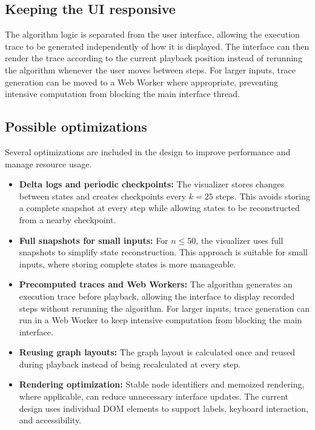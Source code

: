 \documentclass[11pt,a4paper]{article}
\begin{document}
\subsection{Keeping the UI responsive}
The algorithm logic is separated from the user interface, allowing the execution trace to be generated independently of how it is displayed. The interface can then render the trace according to the current playback position instead of rerunning the algorithm whenever the user moves between steps. For larger inputs, trace generation can be moved to a Web Worker where appropriate, preventing intensive computation from blocking the main interface thread.


\subsection{Possible optimizations}

Several optimizations are included in the design to improve
performance and manage resource usage.

\begin{itemize}
    \item \textbf{Delta logs and periodic checkpoints:}
    The visualizer stores changes between states and creates
    checkpoints every $k=25$ steps. This avoids storing a
    complete snapshot at every step while allowing states to
    be reconstructed from a nearby checkpoint.

    \item \textbf{Full snapshots for small inputs:}
    For $n \leq 50$, the visualizer uses full snapshots to
    simplify state reconstruction. This approach is suitable
    for small inputs, where storing complete states is more
    manageable.

    \item \textbf{Precomputed traces and Web Workers:}
    The algorithm generates an execution trace before playback,
    allowing the interface to display recorded steps without
    rerunning the algorithm. For larger inputs, trace generation
    can run in a Web Worker to keep intensive computation from
    blocking the main interface.

    \item \textbf{Reusing graph layouts:}
    The graph layout is calculated once and reused during
    playback instead of being recalculated at every step.

    \item \textbf{Rendering optimization:}
    Stable node identifiers and memoized rendering, where
    applicable, can reduce unnecessary interface updates.
    The current design uses individual DOM elements to support
    labels, keyboard interaction, and accessibility.
\end{itemize}
\end{document}
